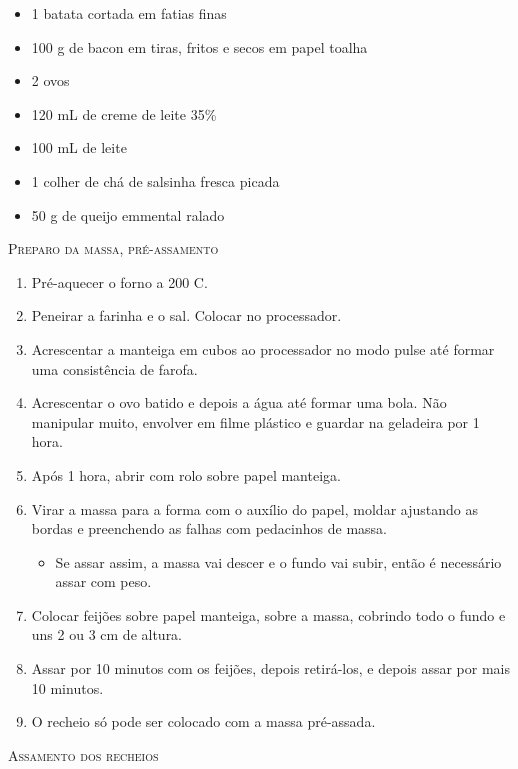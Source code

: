 {	\begin{itemize}
		\item 1 batata cortada em fatias finas
		\item 100 g de bacon em tiras, fritos e secos em papel toalha
		\item 2 ovos
		\item 120 mL de creme de leite 35\%
		\item 100 mL de leite
		\item 1 colher de chá de salsinha fresca picada
		\item 50 g de queijo emmental ralado
	\end{itemize}
}{

	\textsc{Preparo da massa, pré-assamento}

	\begin{enumerate}
		\item Pré-aquecer o forno a 200\grau{} C.
		\item Peneirar a farinha e o sal. Colocar no processador.
		\item Acrescentar a manteiga em cubos ao processador no modo pulse até formar
		      uma consistência de farofa.
		\item Acrescentar o ovo batido e depois a água até formar uma bola. Não
		      manipular muito, envolver em filme plástico e guardar na geladeira por 1
		      hora.
		\item Após 1 hora, abrir com rolo sobre papel manteiga.
		\item Virar a massa para a forma com o auxílio do papel, moldar ajustando as
		      bordas e preenchendo as falhas com pedacinhos de massa.
		      \begin{itemize}
			      \item Se assar assim, a massa vai descer e o fundo vai subir, então é
			            necessário assar com peso.
		      \end{itemize}
		\item Colocar feijões sobre papel manteiga, sobre a massa, cobrindo todo o
		      fundo e uns 2 ou 3 cm de altura.
		\item Assar por 10 minutos com os feijões, depois retirá-los, e depois assar
		      por mais 10 minutos.
		\item O recheio só pode ser colocado com a massa pré-assada.
	\end{enumerate}

	\textsc{Assamento dos recheios}

}
